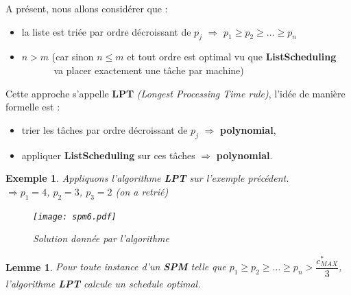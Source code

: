 \documentclass[12pt]{article}
\newcommand{\titre}[1]{\textcolor{title}{#1}}
\newtheorem{exemple}{Exemple}[section]
\newtheorem{lemme}{Lemme}[section]
\begin{document}
\noindent A présent, nous allons considérer que :
\begin{itemize}
\item la liste est triée par ordre décroissant de $p_j$ $\Longrightarrow$ $p_1\geq p_2 \geq \ldots \geq p_n$
\item $n > m$ (car sinon $n\leq m$ et tout ordre est optimal vu que \textbf{ListScheduling} \\\indent $\qquad\quad$ va placer exactement
une tâche par machine) \\
\end{itemize}

Cette approche s'appelle \textbf{LPT} \textit{(Longest Processing Time rule)}, l'idée de manière formelle est :
\begin{itemize}
\item trier les tâches par ordre décroissant de $p_j$ $\Longrightarrow$ \textbf{polynomial},
\item appliquer \textbf{ListScheduling} sur ces tâches $\Longrightarrow$ \textbf{polynomial}.
\end{itemize}

\begin{exemple} Appliquons l'algorithme \textbf{LPT} sur l'exemple précédent.\\
$\Rightarrow p_1 = 4$, $p_2 = 3$, $p_3 = 2$ (on a retrié)
\begin{figure}[H]
    \begin{center}
    \texttt{[image: spm6.pdf]}
    \caption{Solution donnée par l'algorithme}
    \end{center}
\end{figure}
\end{exemple}

\begin{lemme}
Pour toute instance d'un \textbf{\titre{SPM}} telle que $p_1\geq p_2\geq \ldots \geq p_n > \dfrac{c^*_{MAX}}{3}$, l'algorithme \textbf{LPT}
calcule un schedule optimal.
\end{lemme}
\end{document}

